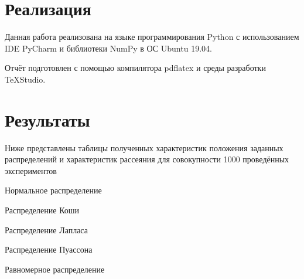 \section{Реализация}
Данная работа реализована на языке программирования Python с использованием IDE PyCharm и библиотеки NumPy в ОС Ubuntu 19.04.

Отчёт подготовлен с помощью компилятора pdflatex и среды разработки TeXStudio.

\section{Результаты}
Ниже представлены таблицы полученных характеристик положения заданных распределений и характеристик рассеяния для совокупности 1000 проведённых экспериментов

\begin{table}[H]
	\begin{center}
		
		\caption{Нормальное распределение}
		\label{tabl:tabl_name}
	\end{center}
\end{table}

\begin{table}[H]
	\begin{center}
		
		\caption{Распределение Коши}
		\label{tabl:tabl_name}
	\end{center}
\end{table}

\begin{table}[H]
	\begin{center}
		
		\caption{Распределение Лапласа}
		\label{tabl:tabl_name}
	\end{center}
\end{table}

\begin{table}[H]
	\begin{center}
		
		\caption{Распределение Пуассона}
		\label{tabl:tabl_name}
	\end{center}
\end{table}

\begin{table}[H]
	\begin{center}
		
		\caption{Равномерное распределение}
		\label{tabl:tabl_name}
	\end{center}
\end{table}


